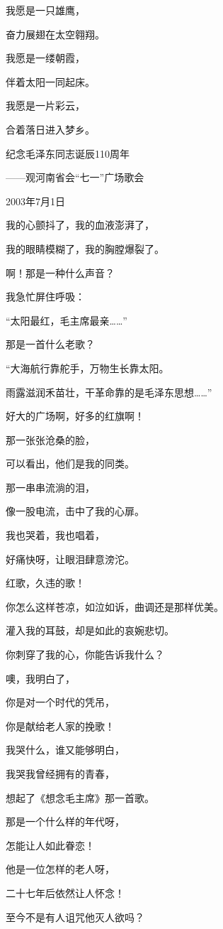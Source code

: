 \documentclass[../../dazhuan.tex]{subfiles}
\begin{document}
我愿是一只雄鹰，

奋力展翅在太空翱翔。

我愿是一缕朝霞，

伴着太阳一同起床。

我愿是一片彩云，

合着落日进入梦乡。



纪念毛泽东同志诞辰110周年

——观河南省会“七一”广场歌会

2003年7月1日

我的心颤抖了，我的血液澎湃了，

我的眼睛模糊了，我的胸膛爆裂了。

啊！那是一种什么声音？

我急忙屏住呼吸：

“太阳最红，毛主席最亲……”

那是一首什么老歌？

“大海航行靠舵手，万物生长靠太阳。

雨露滋润禾苗壮，干革命靠的是毛泽东思想……”

好大的广场啊，好多的红旗啊！

那一张张沧桑的脸，

可以看出，他们是我的同类。

那一串串流淌的泪，

像一股电流，击中了我的心扉。

我也哭着，我也唱着，

好痛快呀，让眼泪肆意滂沱。

红歌，久违的歌！

你怎么这样苍凉，如泣如诉，曲调还是那样优美。

灌入我的耳鼓，却是如此的哀婉悲切。

你刺穿了我的心，你能告诉我什么？

噢，我明白了，

你是对一个时代的凭吊，

你是献给老人家的挽歌！

我哭什么，谁又能够明白，

我哭我曾经拥有的青春，

想起了《想念毛主席》那一首歌。

那是一个什么样的年代呀，

怎能让人如此眷恋！

他是一位怎样的老人呀，

二十七年后依然让人怀念！

至今不是有人诅咒他灭人欲吗？
\end{document}
